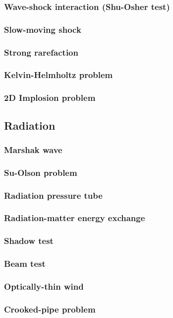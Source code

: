 \documentclass[fleqn,usenatbib]{mnras}
\begin{document}
\subsubsection{Wave-shock interaction (Shu-Osher test)}
\subsubsection{Slow-moving shock}
\subsubsection{Strong rarefaction}
\subsubsection{Kelvin-Helmholtz problem}
\subsubsection{2D Implosion problem}

\subsection{Radiation}
\subsubsection{Marshak wave}
\subsubsection{Su-Olson problem}
\subsubsection{Radiation pressure tube}
\subsubsection{Radiation-matter energy exchange}
\subsubsection{Shadow test}
\subsubsection{Beam test}
\subsubsection{Optically-thin wind}
\subsubsection{Crooked-pipe problem}
\end{document}
